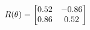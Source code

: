 \documentclass[preview]{standalone}
\begin{document}
\begin{align*}
\special{dvisvgm:raw <g id='unique000'>}R(\theta) = \begin{bmatrix}0.52 & -0.86\\0.86 & 0.52\end{bmatrix}\special{dvisvgm:raw </g>}
\end{align*}
\end{document}
